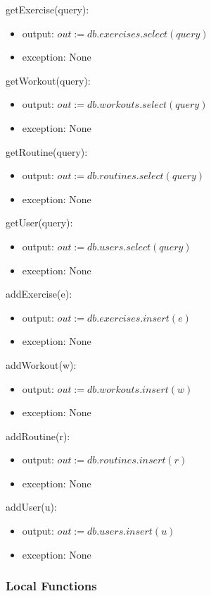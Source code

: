 \documentclass[12pt, titlepage]{article}
\begin{document}
getExercise(query):
\begin{itemize}
	\item output: $out := db.exercises.select(query)$
	\item exception: None
\end{itemize}

getWorkout(query):
\begin{itemize}
	\item output: $out := db.workouts.select(query)$
	\item exception: None
\end{itemize}

getRoutine(query):
\begin{itemize}
	\item output: $out := db.routines.select(query)$
	\item exception: None
\end{itemize}

getUser(query):
\begin{itemize}
	\item output: $out := db.users.select(query)$
	\item exception: None
\end{itemize}


addExercise(e):
\begin{itemize}
	\item output: $out := db.exercises.insert(e)$
	\item exception: None
\end{itemize}

addWorkout(w):
\begin{itemize}
	\item output: $out := db.workouts.insert(w)$
	\item exception: None
\end{itemize}

addRoutine(r):
\begin{itemize}
	\item output: $out := db.routines.insert(r)$
	\item exception: None
\end{itemize}

addUser(u):
\begin{itemize}
	\item output: $out := db.users.insert(u)$
	\item exception: None
\end{itemize}



\subsubsection{Local Functions}
\end{document}
